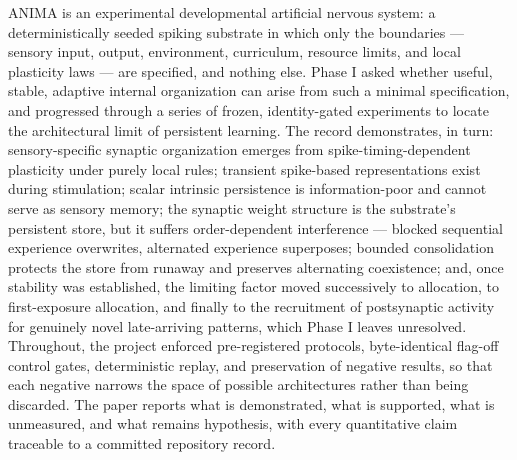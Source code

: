 ANIMA is an experimental developmental artificial nervous system: a
deterministically seeded spiking substrate in which only the boundaries
--- sensory input, output, environment, curriculum, resource limits,
and local plasticity laws --- are specified, and nothing else. Phase I
asked whether useful, stable, adaptive internal organization can arise
from such a minimal specification, and progressed through a series of
frozen, identity-gated experiments to locate the architectural limit of
persistent learning. The record demonstrates, in turn: sensory-specific
synaptic organization emerges from spike-timing-dependent plasticity
under purely local rules; transient spike-based representations exist
during stimulation; scalar intrinsic persistence is information-poor
and cannot serve as sensory memory; the synaptic weight structure is
the substrate's persistent store, but it suffers order-dependent
interference --- blocked sequential experience overwrites, alternated
experience superposes; bounded consolidation protects the store from
runaway and preserves alternating coexistence; and, once stability was
established, the limiting factor moved successively to allocation, to
first-exposure allocation, and finally to the recruitment of postsynaptic
activity for genuinely novel late-arriving patterns, which Phase I
leaves unresolved. Throughout, the project enforced pre-registered
protocols, byte-identical flag-off control gates, deterministic replay,
and preservation of negative results, so that each negative narrows the
space of possible architectures rather than being discarded. The paper
reports what is demonstrated, what is supported, what is unmeasured,
and what remains hypothesis, with every quantitative claim traceable to
a committed repository record.